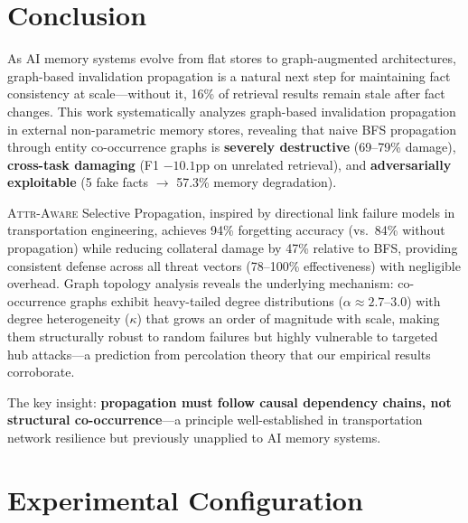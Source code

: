 \documentclass[11pt]{article}
\newcommand{\attraware}{\textsc{Attr-Aware}}
\begin{document}
\section{Conclusion}
\label{sec:conclusion}

As AI memory systems evolve from flat stores to graph-augmented architectures, graph-based invalidation propagation is a natural next step for maintaining fact consistency at scale---without it, 16\% of retrieval results remain stale after fact changes.
This work systematically analyzes graph-based invalidation propagation in external non-parametric memory stores, revealing that naive BFS propagation through entity co-occurrence graphs is \textbf{severely destructive} (69--79\% damage), \textbf{cross-task damaging} (F1 $-10.1$pp on unrelated retrieval), and \textbf{adversarially exploitable} (5 fake facts $\rightarrow$ 57.3\% memory degradation).

\attraware{} Selective Propagation, inspired by directional link failure models in transportation engineering, achieves 94\% forgetting accuracy (vs.\ 84\% without propagation) while reducing collateral damage by 47\% relative to BFS, providing consistent defense across all threat vectors (78--100\% effectiveness) with negligible overhead.
Graph topology analysis reveals the underlying mechanism: co-occurrence graphs exhibit heavy-tailed degree distributions ($\alpha \approx 2.7$--$3.0$) with degree heterogeneity ($\kappa$) that grows an order of magnitude with scale, making them structurally robust to random failures but highly vulnerable to targeted hub attacks---a prediction from percolation theory that our empirical results corroborate.

The key insight: \textbf{propagation must follow causal dependency chains, not structural co-occurrence}---a principle well-established in transportation network resilience but previously unapplied to AI memory systems.

\appendix

\section{Experimental Configuration}
\label{app:config}
\end{document}
